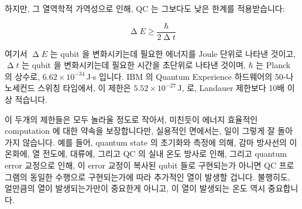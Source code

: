 하지만, 그 열역학적 가역성으로 인해, QC 는 그보다도 낮은 한계를 적용받습니다:

\begin{equation}
	\upDelta E \geq \frac{\hbar}{2 \upDelta t}
\end{equation}

여기서 $\upDelta E$ 는 qubit 을 변화시키는데 필요한 에너지를 Joule 단위로
나타낸 것이고, $\upDelta t$ 는 qubit 을 변화시키는데 필요한 시간을 초단위로
나타낸
것이며, $\hbar$ 는 Planck 의 상수로, $6.62 \times 10^{-34}$\,J$\cdot$s 입니다.
IBM 의 Quantum Experience 하드웨어의 50-나노세컨드 스위칭 타임에서, 이 제한은
$5.52 \times 10^{-27}$\,J, 로, Landauer 제한보다 10배 이상 적습니다.

이 두개의 제한들은 모두 놀라울 정도로 작아서, 미친듯이 에너지 효율적인
computation 에 대한 약속을 보장합니다만, 실용적인 면에서는, 일이 그렇게 잘
돌아가지 않습니다.
예를 들어, quantum state 의 초기화와 측정에 의해, 감마 방사선의 이온화에, 열
전도에, 대류에, 그리고 QC 의 실내 온도 방사로 인해, 그리고 quantum error
교정으로 인해, 이 error 교정이 복사된 qubit 들로 구현되는가 아니면 QC
프로그램의 동일한 수행으로 구현되는가에 따라 추가적인 열이 발생할 겁니다.
불행히도, 얼만큼의 열이 발생되는가만이 중요한게 아니고, 이 열이 발생되는 온도
역시 중요합니다.

